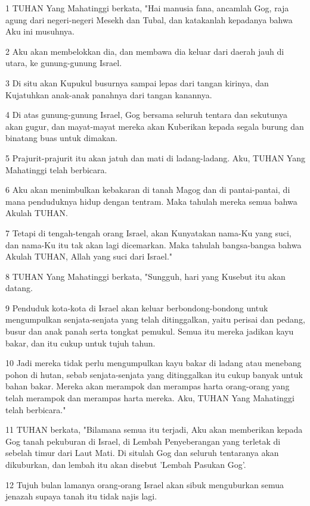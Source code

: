 \par 1 TUHAN Yang Mahatinggi berkata, "Hai manusia fana, ancamlah Gog, raja agung dari negeri-negeri Mesekh dan Tubal, dan katakanlah kepadanya bahwa Aku ini musuhnya.
\par 2 Aku akan membelokkan dia, dan membawa dia keluar dari daerah jauh di utara, ke gunung-gunung Israel.
\par 3 Di situ akan Kupukul busurnya sampai lepas dari tangan kirinya, dan Kujatuhkan anak-anak panahnya dari tangan kanannya.
\par 4 Di atas gunung-gunung Israel, Gog bersama seluruh tentara dan sekutunya akan gugur, dan mayat-mayat mereka akan Kuberikan kepada segala burung dan binatang buas untuk dimakan.
\par 5 Prajurit-prajurit itu akan jatuh dan mati di ladang-ladang. Aku, TUHAN Yang Mahatinggi telah berbicara.
\par 6 Aku akan menimbulkan kebakaran di tanah Magog dan di pantai-pantai, di mana penduduknya hidup dengan tentram. Maka tahulah mereka semua bahwa Akulah TUHAN.
\par 7 Tetapi di tengah-tengah orang Israel, akan Kunyatakan nama-Ku yang suci, dan nama-Ku itu tak akan lagi dicemarkan. Maka tahulah bangsa-bangsa bahwa Akulah TUHAN, Allah yang suci dari Israel."
\par 8 TUHAN Yang Mahatinggi berkata, "Sungguh, hari yang Kusebut itu akan datang.
\par 9 Penduduk kota-kota di Israel akan keluar berbondong-bondong untuk mengumpulkan senjata-senjata yang telah ditinggalkan, yaitu perisai dan pedang, busur dan anak panah serta tongkat pemukul. Semua itu mereka jadikan kayu bakar, dan itu cukup untuk tujuh tahun.
\par 10 Jadi mereka tidak perlu mengumpulkan kayu bakar di ladang atau menebang pohon di hutan, sebab senjata-senjata yang ditinggalkan itu cukup banyak untuk bahan bakar. Mereka akan merampok dan merampas harta orang-orang yang telah merampok dan merampas harta mereka. Aku, TUHAN Yang Mahatinggi telah berbicara."
\par 11 TUHAN berkata, "Bilamana semua itu terjadi, Aku akan memberikan kepada Gog tanah pekuburan di Israel, di Lembah Penyeberangan yang terletak di sebelah timur dari Laut Mati. Di situlah Gog dan seluruh tentaranya akan dikuburkan, dan lembah itu akan disebut 'Lembah Pasukan Gog'.
\par 12 Tujuh bulan lamanya orang-orang Israel akan sibuk menguburkan semua jenazah supaya tanah itu tidak najis lagi.
